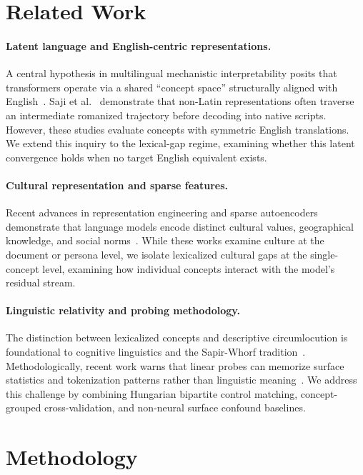 \documentclass{article}
\begin{document}
\section{Related Work}

\paragraph{Latent language and English-centric representations.}
A central hypothesis in multilingual mechanistic interpretability posits that transformers operate via a shared ``concept space'' structurally aligned with English~\cite{schut2025think,wendler2024llamas}. Saji et al.~\cite{saji2025romanlens} demonstrate that non-Latin representations often traverse an intermediate romanized trajectory before decoding into native scripts. However, these studies evaluate concepts with symmetric English translations. We extend this inquiry to the lexical-gap regime, examining whether this latent convergence holds when no target English equivalent exists.

\paragraph{Cultural representation and sparse features.}
Recent advances in representation engineering and sparse autoencoders demonstrate that language models encode distinct cultural values, geographical knowledge, and social norms~\cite{zou2026deciphering,khanuja2026steering,deng2025language}. While these works examine culture at the document or persona level, we isolate lexicalized cultural gaps at the single-concept level, examining how individual concepts interact with the model's residual stream.

\paragraph{Linguistic relativity and probing methodology.}
The distinction between lexicalized concepts and descriptive circumlocution is foundational to cognitive linguistics and the Sapir-Whorf tradition~\cite{sapir1929,brown1954study}. Methodologically, recent work warns that linear probes can memorize surface statistics and tokenization patterns rather than linguistic meaning~\cite{hewitt2019designing,schaeffer2023emergent}. We address this challenge by combining Hungarian bipartite control matching, concept-grouped cross-validation, and non-neural surface confound baselines.

\section{Methodology}
\end{document}

